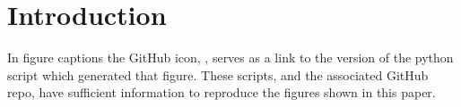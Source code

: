 \section{Introduction}
\label{sec:intro}


In figure captions the GitHub icon, , serves as a link to the version of the python script which generated that figure. These scripts, and the associated GitHub repo, have sufficient information to reproduce the figures shown in this paper.